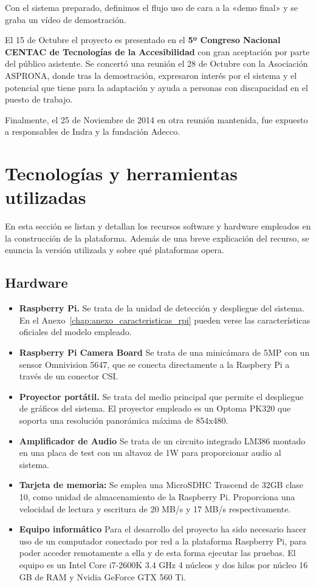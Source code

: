 Con el sistema preparado, definimos el flujo uso de cara a la «demo final» y se graba un vídeo de demostración. 

El 15 de Octubre el proyecto es presentado en el \textbf{5º Congreso Nacional CENTAC de Tecnologías de la Accesibilidad} con gran aceptación por parte del público asistente. Se concertó una reunión el 28 de Octubre con la Asociación ASPRONA, donde tras la demostración, expresaron interés por el sistema y el potencial que tiene para la adaptación y ayuda a personas con discapacidad en el puesto de trabajo.

Finalmente, el 25 de Noviembre de 2014 en otra reunión mantenida, fue expuesto a responsables de Indra y la fundación Adecco.   

\section{Tecnologías y herramientas utilizadas}

En esta sección se listan y detallan los recursos software y hardware empleados en la construcción de la plataforma. Además de una breve explicación del recurso, se enuncia la versión utilizada y sobre qué plataformas opera.

\subsection{Hardware}
\begin{itemize}
\item \textbf{Raspberry Pi.} Se trata de la unidad de detección y despliegue del sistema. En el Anexo~\ref{chap:anexo_caracteristicas_rpi} pueden verse las características oficiales del modelo empleado.
\item \textbf{Raspberry Pi Camera Board}  Se trata de una minicámara de 5MP con un sensor Omnivision 5647, que se conecta directamente a la Raspbery Pi a través de un conector CSI.
\item \textbf{Proyector portátil.} Se trata del medio principal que permite el despliegue de gráficos del sistema. El proyector empleado es un Optoma PK320 que soporta una resolución panorámica máxima de 854x480. 
\item \textbf{Amplificador de Audio} Se trata de un circuito integrado LM386 montado en una placa de test con un altavoz de 1W para proporcionar audio al sistema.
\item \textbf{Tarjeta de memoria:} Se emplea una MicroSDHC Trascend de 32GB clase 10, como unidad de almacenamiento de la Raspberry Pi. Proporciona una velocidad de lectura y escritura de 20 MB/s y 17 MB/s respectivamente. 
\item \textbf{Equipo informático}  Para el desarrollo del proyecto ha sido necesario hacer uso de un computador conectado por red a la plataforma Raspberry Pi, para poder acceder remotamente a ella y de esta forma ejecutar las pruebas. El equipo es un Intel Core i7-2600K 3.4 GHz 4 núcleos y dos hilos por núcleo 16 GB de RAM y Nvidia GeForce GTX 560 Ti.

\end{itemize}

